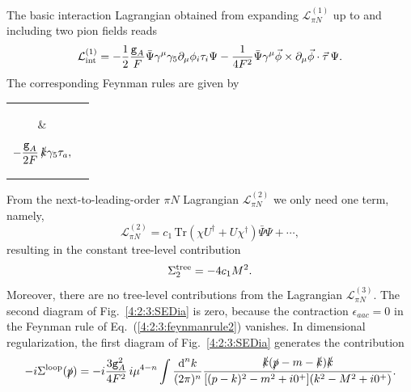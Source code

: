 \documentclass[twoside,12pt]{article}
\begin{document}
   The basic interaction Lagrangian obtained from expanding $\mathcal{L}_{\pi N}^{(1)}$ up
to and including two pion fields reads
\begin{displaymath}
\label{5:3:lpin}
{\cal L}_{\rm int}^{(1)}=-\frac{1}{2}\frac{{\texttt
g}_{A}}{F} \bar{\Psi}\gamma^\mu\gamma_5
\partial_\mu\phi_i\tau_i\Psi
-\frac{1}{4F^2}\bar{\Psi}\gamma^\mu\vec{\phi}
\times\partial_\mu\vec{\phi}\cdot\vec{\tau}\,\Psi.
\end{displaymath}
   The corresponding Feynman rules are given by
\begin{center}
\begin{tabular}{cc}
\parbox{0.15\textwidth}{}&
\parbox{0.2\textwidth}{\begin{equation}
\label{4:2:3:feynmanrule1}
-\frac{{\texttt g}_{A}}{2F}\,\slashed{k}\gamma_5\tau_a,\end{equation}}\\
\\
\parbox{0.2\textwidth}{}&
\parbox{0.3\textwidth}{\begin{equation}
\label{4:2:3:feynmanrule2}
\frac{1}{4F^2}\,(\slashed{k}+\slashed{k}')\epsilon_{abc}\tau_c.
\end{equation}}\\
\\
\end{tabular}
\end{center}
   From the next-to-leading-order $\pi N$ Lagrangian $\mathcal{L}_{\pi N}^{(2)}$ we only need
one term, namely,
\begin{equation}
\label{4:2:3:LpiN2}
\mathcal{L}_{\pi N}^{(2)}=c_1\,\mbox{Tr}(\chi U^\dagger +U\chi^\dagger)\bar{\Psi}\Psi+\cdots,
\end{equation}
resulting in the constant tree-level contribution
\begin{equation}
\Sigma^{\rm tree}_2=-4 c_1 M^2.
\end{equation}
   Moreover, there are no tree-level contributions from the
Lagrangian $\mathcal{L}_{\pi N}^{(3)}$.
   The second diagram of Fig.~\ref{4:2:3:SEDia} is zero, because the
contraction $\epsilon_{aac}=0$ in the Feynman rule of Eq.~(\ref{4:2:3:feynmanrule2}) vanishes.
   In dimensional regularization, the first diagram of
Fig.~\ref{4:2:3:SEDia} generates the contribution
\begin{equation}
\label{4:2:3:Loop1}
-i\Sigma^{\rm loop}(\slashed{p})
=-i\frac{3\texttt{g}_{A}^2}{4F^2}\,
    i\mu^{4-n}\int\frac{\mbox{d}^nk}{(2\pi)^n}\frac{\slashed{k}
    (\slashed{p}-m-\slashed{k})\slashed{k}}
    {[(p-k)^2-m^2+i0^+](k^2-M^2+i0^+)}.
\end{equation}
\end{document}
